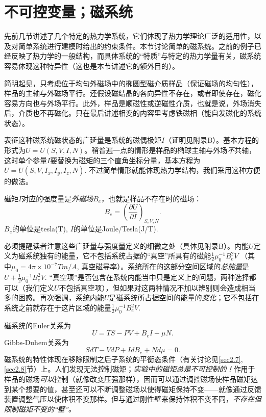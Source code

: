 \section{不可控变量；磁系统}
\label{sec3.8}
先前几节讲述了几个特定的热力学系统，它们体现了热力学理论广泛的适用性，以及对简单系统进行建模时给出的约束条件。本节讨论简单的磁系统。之前的例子已经反映了热力学的一般结构，而具体系统的“特质”与特定的热力学量有关，磁系统容易体现这种特异性（这也是本节讲述它的额外目的）。

简明起见，只考虑位于均匀外磁场中的椭圆型磁介质样品（保证磁场的均匀性），样品的主轴与外磁场平行。还假设磁结晶的各向异性不存在，或者即使存在，磁化容易方向也与外场平行。此外，样品是顺磁性或逆磁性介质，也就是说，外场消失后，介质也不再磁化。只在最后讲述相变的内容里考虑铁磁相（能自发磁化的系统状态）。

表征这种磁系统磁状态的广延量是系统的磁偶极矩$I$（证明见附录B）。基本方程的形式为$U = U(S, V, I, N)$。稍普遍一点的情形是样品的椭球主轴与外场{\it 不}共轴，这时单个参量$I$要替换为磁矩的三个直角坐标分量，基本方程为$U = U(S, V, I_x, I_y, I_z, N)$. 不过简单情形就能体现热力学结构，我们采用这种方便的做法。

磁矩$I$对应的强度量是{\it 外磁场}$B_e$，也就是样品不存在时的磁场：
\begin{equation}
    B_e = \left( \frac{\partial U}{\partial I} \right)_{S, V, N}.
\label{equ3.63}
\end{equation}
$B_e$的单位是tesla(T), $I$的单位是Joule/Tesla(J/T).

必须提醒读者注意这些广延量与强度量定义的细微之处（具体见附录B）。内能$U$定义为磁系统独有的能量，它不包括系统占据的“真空”所具有的磁能$\frac{1}{2} \mu_0^{-1} B_e^2 V$ （其中$\mu_0 = 4\pi \times 10^{-7} \si{T m / A}$, 真空磁导率）。系统所在的这部分空间区域的{\it 总能量}是$U + \frac{1}{2} \mu_0^{-1} B_e^2 V$. “真空项”是否包含在系统内能当中只是定义上的问题，两种选择都可以（我们定义$U$不包括真空项），但如果对这两种情况不加以辨别则会造成相当多的困惑。再次强调，系统内能$U$是磁系统所占据空间的能量的{\it 变化}；它不包括在系统之前就存在于这片区域的能量$\frac{1}{2} \mu_0^{-1} B_e^2 V$.

磁系统的Euler关系为
\begin{equation}
    U = TS - PV + B_e I + \mu N.
\label{equ3.64}
\end{equation}
Gibbs-Duhem关系为
\begin{equation}
    SdT - VdP + IdB_e + Nd\mu = 0.
\label{equ3.65}
\end{equation}
磁系统的特性体现在移除限制之后子系统的平衡态条件（有关讨论见\ref{sec2.7}, \ref{sec2.8}节）上。人们发现无法控制磁矩；{\it 实验中的磁矩总是不可控制的！}作用于样品的磁场{\it 可以}控制（就像改变压强那样），因而可以通过调控磁场使样品磁矩达到某个想要的值，甚至还可以不断调整磁场以使得磁矩保持不变——就像通过反馈装置调整气压以使体积不变那样。但与通过刚性壁来保持体积不变不同，{\it 不存在但限制磁矩不变的“壁”。}

